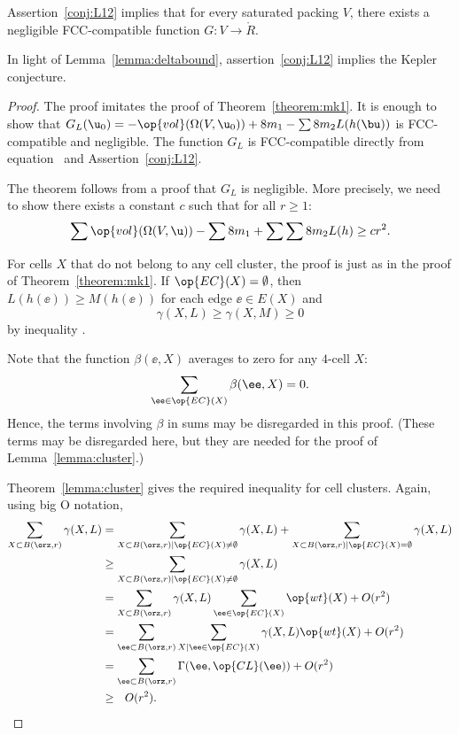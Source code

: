 \begin{lemma}[]\label{theorem:mk2} 
Assertion~\ref{conj:L12} implies
that for every saturated packing $V$, there exists a negligible FCC-compatible function
$G:V\to \ring{R}$.
\end{lemma}

\begin{remark}\label{rem:L12KC}
In light of Lemma~\ref{lemma:deltabound}, assertion~\ref{conj:L12}
implies the Kepler conjecture. 
\end{remark}

\begin{proof} The proof imitates the proof of
Theorem~\ref{theorem:mk1}.  It is enough to show that $G_L( \u_0) =
-\op{vol}(\Omega(V, \u_0)) + 8 m_1 - \sum 8 m_2 L(h(\bu))$ is
FCC-compatible and negligible.  The function $G_L$ is FCC-compatible
directly from equation~ and Assertion~\ref{conj:L12}.

The theorem follows from a proof that $G_L$ is negligible.  More
precisely, we need to show there exists a constant $c$ such that
for all $r\ge 1$:%
\begin{equation}\label{eqn:A2neg} 
\sum \op{vol}(\Omega(V, \u)) -\sum 8m_1 + \sum \sum 8 m_2 L(h) \ge c r^2.
\end{equation}

For cells $X$ that do not belong to any cell cluster,
the proof is just as in the proof of Theorem~\ref{theorem:mk1}.
If $\op{EC}(X)=\emptyset$, then 
$L(h(\ee))\ge M(h(\ee))$ for each edge $\ee\in E(X)$ and
\[ \gamma(X,L)\ge \gamma(X,M)\ge 0\]  
by inequality .

Note that the function $\beta(\ee,X)$ averages to zero for any $4$-cell $X$:
\[  
\sum_{\ee\in \op{EC}(X)} \beta(\ee,X) = 0.
\] 
Hence, the terms involving $\beta$ in sums may be disregarded in this proof.
(These terms may be disregarded here, but they are
needed for the proof of Lemma~\ref{lemma:cluster}.)

Theorem~\ref{lemma:cluster} gives the required inequality for cell
clusters.  Again, using big O notation,
\begin{align*} 
\sum_{X\subset B(\orz,r)} \gamma(X,L) &=
\sum_{X\subset B(\orz,r)\mid \op{EC}(X)\ne\emptyset} \gamma(X,L) +
\sum_{X\subset B(\orz,r)\mid \op{EC}(X)=\emptyset} \gamma(X,L) \vspace{6pt}\\
&\ge \sum_{X\subset B(\orz,r)\mid \op{EC}(X)\ne\emptyset} \gamma(X,L)\vspace{6pt} \\
&=\sum_{X\subset B(\orz,r)}\gamma(X,L)\sum_{\ee \in \op{EC}(X)}\op{wt}(X) + O(r^2)\vspace{6pt}\\
&=\sum_{\ee\subset B(\orz,r)}\sum_{X\mid \ee \in \op{EC}(X)}\gamma(X,L)\op{wt}(X) + O(r^2)\vspace{6pt}\\
&=\sum_{\ee\subset B(\orz,r)}\Gamma(\ee,\op{CL}(\ee)) + O(r^2)\vspace{6pt}\\
&\ge ~~O(r^2).
\end{align*}



\end{proof}
